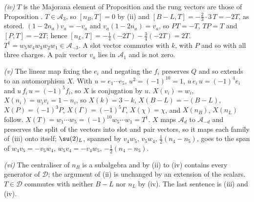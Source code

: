 \emph{(iv)} $T$ is the Majorana element of Proposition  and the rung vectors are those of Proposition . $T \in \mathcal{A}_{3}$, so $[n_{B}, T] = 0$ by (ii) and $[B - L, T] = -\tfrac23 \cdot 3\,T = -2T$, as stored. $(1 - 2n_{a})v_{a} = -v_{a}$ and $v_{a}(1 - 2n_{a}) = v_{a}$, so $PT = -T$, $TP = T$ and $[P, T] = -2T$; hence $[n_{L}, T] = -\tfrac14(-2T) - \tfrac34(-2T) = 2T$. $T^{\dagger} = w_{5}w_{4}w_{3}w_{2}w_{1} \in \mathcal{A}_{-3}$. A slot vector commutes with $k$, with $P$ and so with all three charges. A pair vector $v_{a}$ lies in $\mathcal{A}_{1}$ and is not zero.

\emph{(v)} The linear map fixing the $e_{i}$ and negating the $f_{i}$ preserves $Q$ and so extends to an automorphism $X$. With $u = e_{1}\cdots e_{5}$, $u^{2} = (-1)^{10} = 1$, $u\,e_{i}\,u = (-1)^{4}e_{i}$ and $u\,f_{i}\,u = (-1)^{5}f_{i}$, so $X$ is conjugation by $u$. $X(v_{i}) = w_{i}$, $X(n_{i}) = w_{i}v_{i} = 1 - n_{i}$, so $X(k) = 3 - k$, $X(B - L) = -(B - L)$, $X(P) = (-1)^{3}P$, $X(\Gamma) = (-1)^{5}\Gamma$, $X(\chi) = \chi$, and $X(n_{B})$, $X(n_{L})$ follow. $X(T) = w_{1}\cdots w_{5} = (-1)^{10}w_{5}\cdots w_{1} = T^{\dagger}$. $X$ maps $\mathcal{A}_{d}$ to $\mathcal{A}_{-d}$ and preserves the split of the vectors into slot and pair vectors, so it maps each family of (iii) onto itself; $\su(2)_{L}$, spanned by $v_{4}w_{5}$, $v_{5}w_{4}$, $\tfrac12(n_{4} - n_{5})$, goes to the span of $w_{4}v_{5} = -v_{5}w_{4}$, $w_{5}v_{4} = -v_{4}w_{5}$, $-\tfrac12(n_{4} - n_{5})$.

\emph{(vi)} The centraliser of $n_{B}$ is a subalgebra and by (ii) to (iv) contains every generator of $\mathcal{D}$; the argument of (ii) is unchanged by an extension of the scalars. $T \in \mathcal{D}$ commutes with neither $B - L$ nor $n_{L}$ by (iv). The last sentence is (iii) and (iv).

